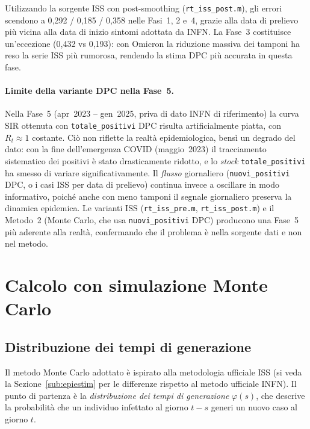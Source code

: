 \documentclass[12pt, a4paper]{article}
\begin{document}
Utilizzando la sorgente ISS con post-smoothing (\texttt{rt\_iss\_post.m}), gli errori
scendono a 0{,}292 / 0{,}185 / 0{,}358 nelle Fasi~1, 2 e~4, grazie alla data di prelievo
più vicina alla data di inizio sintomi adottata da INFN.
La Fase~3 costituisce un'eccezione (0{,}432 vs 0{,}193): con Omicron la riduzione massiva
dei tamponi ha reso la serie ISS più rumorosa, rendendo la stima DPC più accurata in
questa fase.

\paragraph{Limite della variante DPC nella Fase~5.}
Nella Fase~5 (apr~2023 -- gen~2025, priva di dato INFN di riferimento) la curva SIR ottenuta con
\texttt{totale\_positivi} DPC risulta artificialmente piatta, con $R_t \approx 1$ costante.
Ciò non riflette la realtà epidemiologica, bensì un degrado del dato: con la fine
dell'emergenza COVID (maggio~2023) il tracciamento sistematico dei positivi è stato
drasticamente ridotto, e lo \emph{stock} \texttt{totale\_positivi} ha smesso di variare
significativamente.
Il \emph{flusso} giornaliero (\texttt{nuovi\_positivi} DPC, o i casi ISS per data di prelievo)
continua invece a oscillare in modo informativo, poiché anche con meno tamponi il segnale
giornaliero preserva la dinamica epidemica.
Le varianti ISS (\texttt{rt\_iss\_pre.m}, \texttt{rt\_iss\_post.m}) e il Metodo~2
(Monte Carlo, che usa \texttt{nuovi\_positivi} DPC) producono una Fase~5 più aderente
alla realtà, confermando che il problema è nella sorgente dati e non nel metodo.

\section{Calcolo con simulazione Monte Carlo}
\label{sec:mc}

\subsection{Distribuzione dei tempi di generazione}

Il metodo Monte Carlo adottato è ispirato alla metodologia ufficiale ISS \cite{Merler2020}
(si veda la Sezione~\ref{sub:epiestim} per le differenze rispetto al metodo ufficiale INFN).
Il punto di partenza è la \emph{distribuzione dei tempi di generazione} $\varphi(s)$, che
descrive la probabilità che un individuo infettato al giorno $t-s$ generi un nuovo caso al
giorno $t$.
\end{document}
